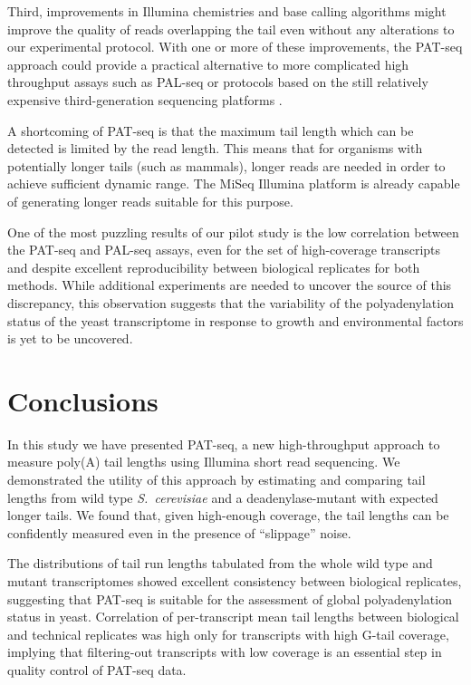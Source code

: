 \documentclass[10pt]{article}
\begin{document}
Third, improvements in Illumina chemistries and base calling algorithms might improve the quality of reads overlapping the tail even without any alterations to our experimental protocol. With one or more of these improvements, the PAT-seq approach could provide a practical alternative to more complicated high throughput assays such as PAL-seq or protocols based on the still relatively expensive third-generation sequencing platforms \cite{sharon13}.

A shortcoming of PAT-seq is that the maximum tail length which can be detected is limited by the read length. This means that for organisms with potentially longer tails (such as mammals), longer reads are needed in order to achieve sufficient dynamic range. The MiSeq Illumina platform is already capable of generating longer reads suitable for this purpose.

One of the most puzzling results of our pilot study is the low correlation between the PAT-seq and PAL-seq assays, even for the set of high-coverage transcripts and despite excellent reproducibility between biological replicates for both methods. While additional experiments are needed to uncover the source of this discrepancy, this observation suggests that the variability of the polyadenylation status of the yeast transcriptome in response to growth and environmental factors is yet to be uncovered.

\section*{Conclusions}

In this study we have presented PAT-seq, a new high-throughput approach to measure poly(A) tail lengths using Illumina short read sequencing. We demonstrated the utility of this approach by estimating and comparing tail lengths from wild type \textit{S.~cerevisiae} and a deadenylase-mutant with expected longer tails. We found that, given high-enough coverage, the tail lengths can be confidently measured even in the presence of ``slippage'' noise.

The distributions of tail run lengths tabulated from the whole wild type and mutant transcriptomes showed excellent consistency between biological replicates, suggesting that PAT-seq is suitable for the assessment of global polyadenylation status in yeast.
Correlation of per-transcript mean tail lengths between biological and technical replicates was high only for transcripts with high G-tail coverage, implying that filtering-out transcripts with low coverage is an essential step in quality control of PAT-seq data.
\end{document}
